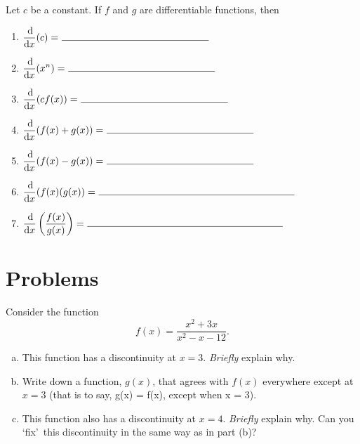 \documentclass[12pt]{amsart}
\begin{document}
\vspace{.25in}

\begin{thm}[7 Points]
  Let \(c\) be a constant.
  If \(f\) and \(g\) are differentiable functions, then
  \begin{enumerate}
  \item
    \(\displaystyle{\frac{\dif}{\dif x}(c) =\ \line(1,0){150}}\)
    \vspace{.25in}
  \item
    \(\displaystyle{\frac{\dif}{\dif x}(x^n) =\ \line(1,0){150}}\)
    \vspace{.25in}
  \item
    \(\displaystyle{\frac{\dif}{\dif x}(cf(x)) =\ \line(1,0){150}}\)
    \vspace{.25in}
  \item
    \(\displaystyle{\frac{\dif}{\dif x}(f(x) + g(x)) =\ \line(1,0){150}}\)
    \vspace{.25in}
  \item
    \(\displaystyle{\frac{\dif}{\dif x}(f(x) - g(x)) =\ \line(1,0){150}}\)
    \vspace{.25in}
  \item
    \(\displaystyle{\frac{\dif}{\dif x}(f(x)(g(x)) =\ \line(1,0){200}}\)
    \vspace{.25in}
  \item
    \(\displaystyle{\frac{\dif}{\dif x}\left(\frac{f(x)}{g(x)}\right) =\ \line(1,0){200}}\)
  \end{enumerate}
\end{thm}

\section*{Problems}
\begin{thm}[10 Points]
  Consider the function
  \[f(x) = \frac{x^2 + 3x}{x^2 - x - 12}.\]
  \begin{enumerate}[(a)]
  \item
    This function has a discontinuity at \(x = 3\).
    \textit{Briefly} explain why.
  \item
    Write down a function, \(g(x)\), that agrees with \(f(x)\) everywhere except at \(x = 3\) (that is to say, g(x) = f(x), except when x = 3).
  \item
    This function also has a discontinuity at \(x = 4\).
    \textit{Briefly} explain why.
    Can you \lq fix\rq\ this discontinuity in the same way as in part (b)?
  \end{enumerate}
    
\end{thm}
\end{document}
